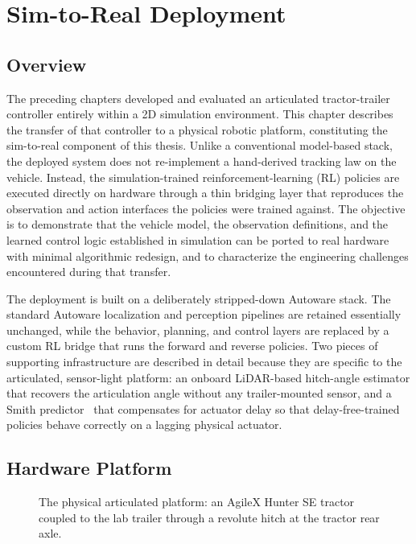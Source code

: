 \chapter{Sim-to-Real Deployment}
\label{ch:sim_to_real}

\section{Overview}

The preceding chapters developed and evaluated an articulated tractor-trailer controller entirely within a 2D simulation environment. This chapter describes the transfer of that controller to a physical robotic platform, constituting the sim-to-real component of this thesis. Unlike a conventional model-based stack, the deployed system does not re-implement a hand-derived tracking law on the vehicle. Instead, the simulation-trained reinforcement-learning (RL) policies are executed directly on hardware through a thin bridging layer that reproduces the observation and action interfaces the policies were trained against. The objective is to demonstrate that the vehicle model, the observation definitions, and the learned control logic established in simulation can be ported to real hardware with minimal algorithmic redesign, and to characterize the engineering challenges encountered during that transfer.

The deployment is built on a deliberately stripped-down Autoware stack. The standard Autoware localization and perception pipelines are retained essentially unchanged, while the behavior, planning, and control layers are replaced by a custom RL bridge that runs the forward and reverse policies. Two pieces of supporting infrastructure are described in detail because they are specific to the articulated, sensor-light platform: an onboard LiDAR-based hitch-angle estimator that recovers the articulation angle without any trailer-mounted sensor, and a Smith predictor~\cite{smith1957closer} that compensates for actuator delay so that delay-free-trained policies behave correctly on a lagging physical actuator.

\section{Hardware Platform}

\begin{figure}[t]
  \centering
  \caption{The physical articulated platform: an AgileX Hunter SE tractor coupled to the lab trailer through a revolute hitch at the tractor rear axle.}
  \label{fig:hw_platform}
\end{figure}

